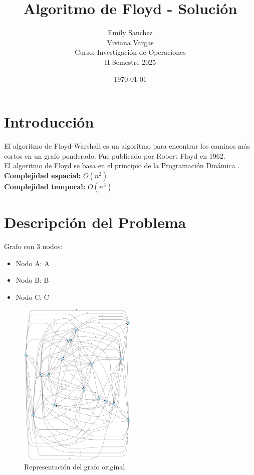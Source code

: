 \documentclass[12pt]{article}
\title{Algoritmo de Floyd - Solución}
\author{Emily Sanchez \\ Viviana Vargas \\[1cm] Curso: Investigación de Operaciones \\ II Semestre 2025}
\date{\today}
\begin{document}
\maketitle
\thispagestyle{empty}
\newpage
\setcounter{page}{1}

\section{Introducción}
El algoritmo de Floyd-Warshall es un algoritmo para encontrar los caminos más cortos en un grafo ponderado. Fue publicado por Robert Floyd en 1962.\\
El algoritmo de Floyd se basa en el principio de la Programación Dinámica .\\
\textbf{Complejidad espacial:} $O(n^2)$\\
\textbf{Complejidad temporal:} $O(n^3)$\\
\clearpage
\section{Descripción del Problema}
Grafo con 3 nodos:

\begin{itemize}
\item Nodo A: A
\item Nodo B: B
\item Nodo C: C
\end{itemize}

\begin{figure}[h!]
\centering
\includegraphics[width=0.5\textwidth,keepaspectratio]{grafo.png}
\caption{Representación del grafo original}
\end{figure}
\end{document}
